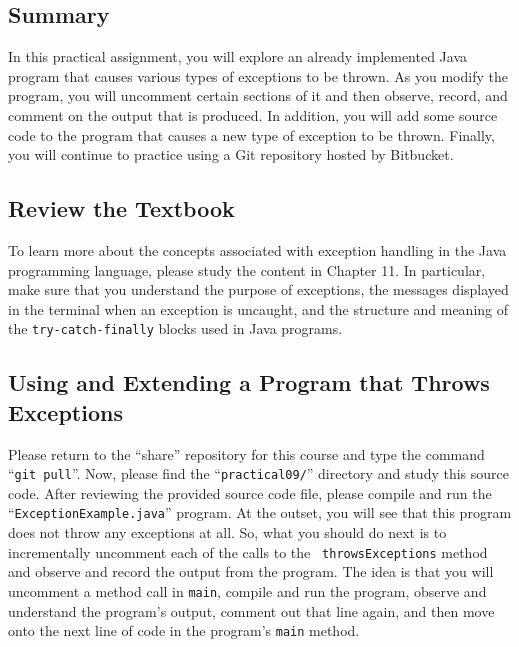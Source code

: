 



\vspace*{-.4in}
\subsection*{Summary}
\vspace*{-.05in}

In this practical assignment, you will explore an already implemented Java program that causes various types of
exceptions to be thrown. As you modify the program, you will uncomment certain sections of it and then observe, record,
and comment on the output that is produced. In addition, you will add some source code to the program that causes a new
type of exception to be thrown. Finally, you will continue to practice using a Git repository hosted by Bitbucket.

\vspace*{-.15in}
\subsection*{Review the Textbook}
\vspace*{-.05in}

To learn more about the concepts associated with exception handling in the Java programming language, please study the
content in Chapter 11. In particular, make sure that you understand the purpose of exceptions, the messages displayed in
the terminal when an exception is uncaught, and the structure and meaning of the {\tt try-catch-finally} blocks used in
Java programs.

\vspace*{-.15in}
\subsection*{Using and Extending a Program that Throws Exceptions}
\vspace*{-.05in}

Please return to the ``share'' repository for this course and type the command ``{\tt git pull}''. Now, please find the
``{\tt practical09/}'' directory and study this source code. After reviewing the provided source code file, please
compile and run the ``{\tt ExceptionExample.java}'' program. At the outset, you will see that this program does not
throw any exceptions at all. So, what you should do next is to incrementally uncomment each of the calls to the {\tt
throwsExceptions} method and observe and record the output from the program. The idea is that you will uncomment a
method call in {\tt main}, compile and run the program, observe and understand the program's output, comment out that
line again, and then move onto the next line of code in the program's {\tt main} method.

